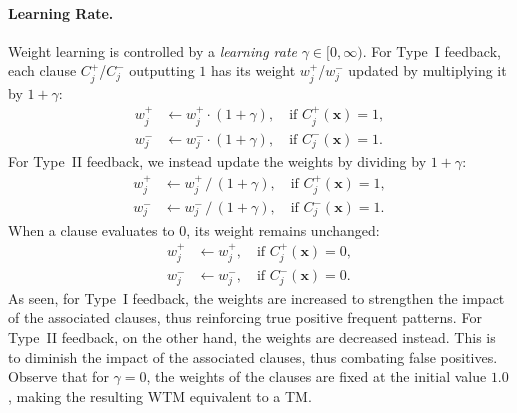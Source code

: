\documentclass[letterpaper]{article}
\begin{document}
\paragraph{Learning Rate.} Weight learning is controlled by a \emph{learning rate} $\gamma\in[0,\infty)$. For Type~I feedback, each clause $C^+_j$/$C^-_j$ outputting $1$ has its weight $w^+_j$/$w^-_j$ updated by multiplying it by $1+\gamma$:
\begin{align}
w^+_j&\gets w^+_j\cdot(1+\gamma),\quad\text{if }C^+_j(\mathbf x)=1,\\
w^-_j&\gets w^-_j\cdot(1+\gamma),\quad\text{if }C^-_j(\mathbf x)=1.
\end{align}
For Type~II feedback, we instead update the weights by dividing by $1+\gamma$:
\begin{align}
w^+_j&\gets w^+_j\,/\,(1+\gamma),\quad\text{if }C^+_j(\mathbf x)=1,\\
w^-_j&\gets w^-_j\,/\,(1+\gamma),\quad\text{if }C^-_j(\mathbf x)=1.
\end{align}
When a clause evaluates to $0$, its weight remains unchanged:
\begin{align}
w^+_j&\gets w^+_j,\quad\text{if }C^+_j(\mathbf x)=0,\\
w^-_j&\gets w^-_j,\quad\text{if }C^-_j(\mathbf x)=0.
\end{align}
As seen, for Type~I feedback, the weights are increased to strengthen the impact of the associated clauses, thus reinforcing true positive frequent patterns. For Type~II feedback, on the other hand, the weights are decreased instead. This is to diminish the impact of the associated clauses, thus combating false positives. Observe that for $\gamma=0$, the weights of the clauses are fixed at the initial value $1.0$, making the resulting WTM equivalent to a TM.



\def\nothing{
\subsection{Coefficient Normalization}
In TM, there is a threshold $T$, and training tries to push the signed sum out of the interval $(-T,T)$. If the coefficients of negative and positive clauses are doubled, the signed sum will be doubled. This helps the signed sum to get larger in the magnitude. Thus, the threshold encourages the coefficient to get larger, not on the necessity of better classification but for filling the gap between the signed sum and the boundaries. This phenomenon can be avoided by coefficient normalization.

The initial sum of the coefficients is equal to $c_P+c_N$, the total number of clauses. After training for each sample, the coefficients may change. We multiply every coefficient $f_i$ by the normalization factor
\begin{align}
\nu=\frac{c_P+c_N}{\sum_{i=1}^{c_P}f^+_i+\sum_{j=1}^{c_N}f^-_j}
\end{align}
so that the sum of the coefficients remains the same:
\begin{align}
f_i^{\mathit{new}}=\nu f_i.
\end{align}
}
\end{document}
